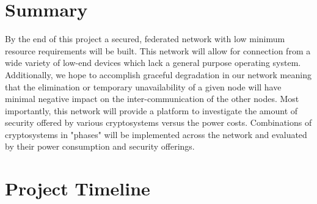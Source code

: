 \documentclass[tikz,a4paper,titlepage]{article}
\begin{document}
\section{Summary}

By the end of this project a secured, federated network with low minimum resource requirements will be built. This network will allow for connection from a wide variety of low-end devices which lack a general purpose operating system. Additionally, we hope to accomplish graceful degradation in our network meaning that the elimination or temporary unavailability of a given node will have minimal negative impact on the inter-communication of the other nodes. Most importantly, this network will provide a platform to investigate the amount of security offered by various cryptosystems versus the power costs. Combinations of cryptosystems in "phases" will be implemented across the network and evaluated by their power consumption and security offerings.

\section{Project Timeline}
\end{document}
